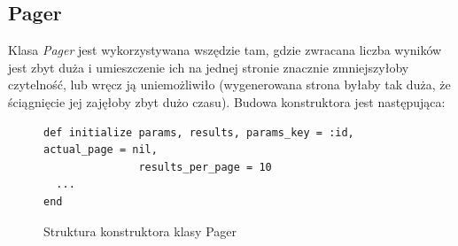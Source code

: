 \documentclass[a4paper,12pt,oneside]{report}
\begin{document}
\subsection{Pager}
\label{sub:pager}
Klasa \emph{Pager} jest wykorzystywana wszędzie tam, gdzie zwracana liczba wyników jest zbyt duża i umieszczenie ich na jednej stronie znacznie zmniejszyłoby czytelność, lub wręcz ją uniemożliwiło (wygenerowana strona byłaby tak duża, że ściągnięcie jej zajęłoby zbyt dużo czasu). Budowa konstruktora jest następująca:

\begin{figure}[h]
\begin{verbatim}def initialize params, results, params_key = :id, actual_page = nil,
               results_per_page = 10
  ...
end\end{verbatim}
\caption{Struktura konstruktora klasy Pager\label{fig:page}}
\end{figure}
\end{document}

